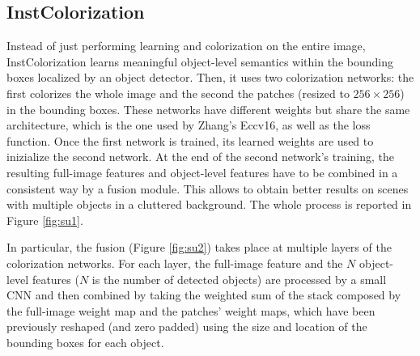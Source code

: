 \subsection{InstColorization}
Instead of just performing learning and colorization on the entire image, InstColorization learns meaningful
object-level semantics within the bounding boxes localized by an object detector. Then, it uses two colorization
networks: the first colorizes the whole image and the second the patches (resized to $256\times256$) in the bounding
boxes. These networks have different weights but share the same architecture, which is the one used by Zhang's Eccv16,
as well as the loss function. Once the first network is trained, its learned weights are used to inizialize the
second network. At the end of the second network's training, the resulting full-image features and object-level features have to be combined in a consistent way by a fusion module. This allows to obtain better results on scenes with multiple objects in a cluttered background. The whole process is reported in Figure \ref{fig:su1}.

In particular, the fusion (Figure \ref{fig:su2}) takes place at multiple layers of the colorization networks. For each layer, the full-image feature and the $N$ object-level features ($N$ is the number of detected objects) are processed by a small CNN and then combined by taking the weighted sum of the stack composed by the full-image weight map and the patches' weight maps, which have been previously reshaped (and zero padded) using the size and location of the bounding boxes for each object.


